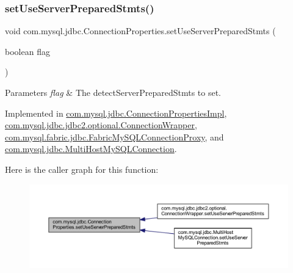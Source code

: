 \subsubsection{\texorpdfstring{set\+Use\+Server\+Prepared\+Stmts()}{setUseServerPreparedStmts()}}
{\footnotesize\ttfamily void com.\+mysql.\+jdbc.\+Connection\+Properties.\+set\+Use\+Server\+Prepared\+Stmts (\begin{DoxyParamCaption}\item[{boolean}]{flag }\end{DoxyParamCaption})}


\begin{DoxyParams}{Parameters}
{\em flag} & The detect\+Server\+Prepared\+Stmts to set. \\
\hline
\end{DoxyParams}


Implemented in \mbox{\hyperlink{classcom_1_1mysql_1_1jdbc_1_1_connection_properties_impl_a0660fbe7acc74e4c2aa96f138956694c}{com.\+mysql.\+jdbc.\+Connection\+Properties\+Impl}}, \mbox{\hyperlink{classcom_1_1mysql_1_1jdbc_1_1jdbc2_1_1optional_1_1_connection_wrapper_a87cc13b16614e7a9ab998e64518d35bd}{com.\+mysql.\+jdbc.\+jdbc2.\+optional.\+Connection\+Wrapper}}, \mbox{\hyperlink{classcom_1_1mysql_1_1fabric_1_1jdbc_1_1_fabric_my_s_q_l_connection_proxy_a826569072259e7f9c8ec525983c14f8f}{com.\+mysql.\+fabric.\+jdbc.\+Fabric\+My\+S\+Q\+L\+Connection\+Proxy}}, and \mbox{\hyperlink{classcom_1_1mysql_1_1jdbc_1_1_multi_host_my_s_q_l_connection_a94135430993c4b5420c93a25e97f2012}{com.\+mysql.\+jdbc.\+Multi\+Host\+My\+S\+Q\+L\+Connection}}.

Here is the caller graph for this function\+:\nopagebreak
\begin{figure}[H]
\begin{center}
\leavevmode
\includegraphics[width=350pt]{interfacecom_1_1mysql_1_1jdbc_1_1_connection_properties_ace9e4d9927b8eb7afd57054f4adf6316_icgraph}
\end{center}
\end{figure}
\mbox{\label{interfacecom_1_1mysql_1_1jdbc_1_1_connection_properties_a479e40c9b5781e950ec3fca32646964b}} 
